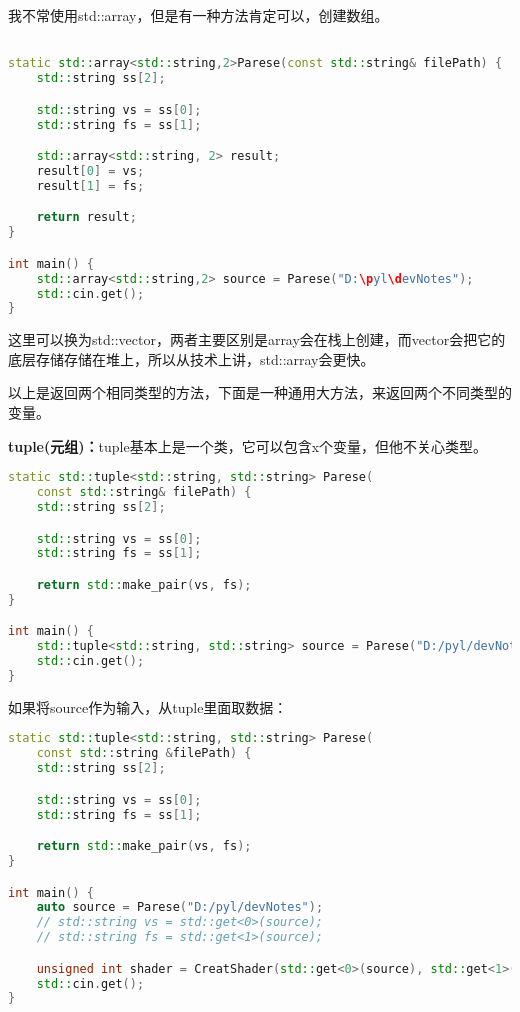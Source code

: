 我不常使用std::array，但是有一种方法肯定可以，创建数组。

\begin{lstlisting}[language=c++]

static std::array<std::string,2>Parese(const std::string& filePath) {
    std::string ss[2];

    std::string vs = ss[0];
    std::string fs = ss[1];

    std::array<std::string, 2> result;
    result[0] = vs;
    result[1] = fs;

    return result;
}

int main() {
    std::array<std::string,2> source = Parese("D:\pyl\devNotes");
    std::cin.get();
}
\end{lstlisting}

这里可以换为std::vector，两者主要区别是array会在栈上创建，而vector会把它的底层存储存储在堆上，所以从技术上讲，std::array会更快。

以上是返回两个相同类型的方法，下面是一种通用大方法，来返回两个不同类型的变量。

\textbf{tuple(元组)：}tuple基本上是一个类，它可以包含x个变量，但他不关心类型。


\begin{lstlisting}[language=c++]
static std::tuple<std::string, std::string> Parese(
    const std::string& filePath) {
    std::string ss[2];

    std::string vs = ss[0];
    std::string fs = ss[1];

    return std::make_pair(vs, fs);
}

int main() {
    std::tuple<std::string, std::string> source = Parese("D:/pyl/devNotes");
    std::cin.get();
}
\end{lstlisting}


如果将source作为输入，从tuple里面取数据：

\begin{lstlisting}[language=c++]
static std::tuple<std::string, std::string> Parese(
    const std::string &filePath) {
    std::string ss[2];

    std::string vs = ss[0];
    std::string fs = ss[1];

    return std::make_pair(vs, fs);
}

int main() {
    auto source = Parese("D:/pyl/devNotes");
    // std::string vs = std::get<0>(source);
    // std::string fs = std::get<1>(source);

    unsigned int shader = CreatShader(std::get<0>(source), std::get<1>(source));
    std::cin.get();
}
\end{lstlisting}

